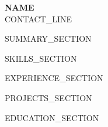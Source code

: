 \documentclass[10pt,letterpaper]{article}
\begin{document}

\begin{center}
    {\LARGE \textbf{{{NAME}}}}\\[4pt]
    {{CONTACT_LINE}}
\end{center}


{{SUMMARY_SECTION}}


{{SKILLS_SECTION}}


{{EXPERIENCE_SECTION}}


{{PROJECTS_SECTION}}


{{EDUCATION_SECTION}}
\end{document}
